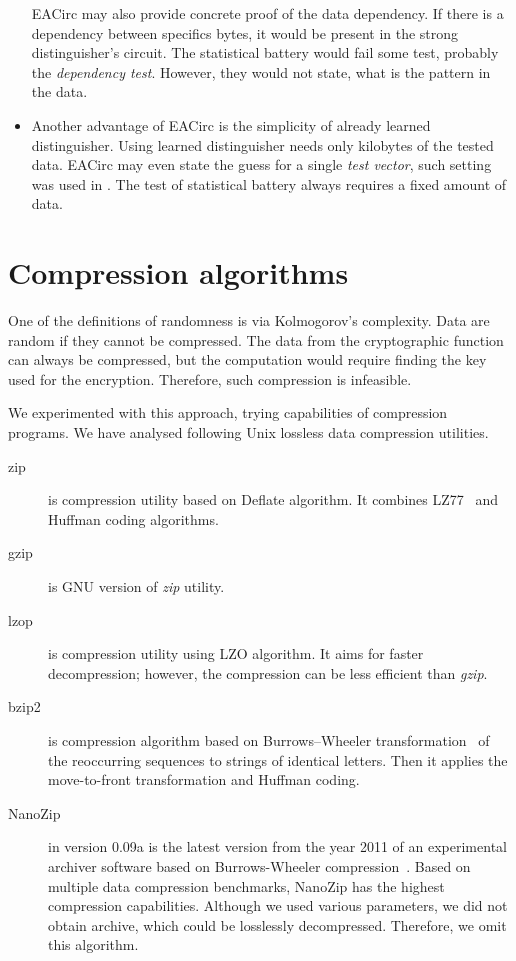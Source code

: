 \documentclass[
    digital,    %
    oneside,    %
    color,
    11pt,
    nocover,
    notable,
    nolof,
    nolot,
]{fithesis3}
\begin{document}
\begin{itemize}
    EACirc may also provide concrete proof of the data dependency. If there is a dependency between specifics bytes, it would be present in the strong distinguisher's circuit. The statistical battery would fail some test, probably the \textit{dependency test}. However, they would not state, what is the pattern in the data.
    \item Another advantage of EACirc is the simplicity of already learned distinguisher. Using learned distinguisher needs only kilobytes of the tested data. EACirc may even state the guess for a single \textit{test vector}, such setting was used in \cite{ukropBcThesis}. The test of statistical battery always requires a fixed amount of data.
\end{itemize}

\section{Compression algorithms}
\label{sec:relatwork-compress}

One of the definitions of randomness is via Kolmogorov's complexity. Data are random if they cannot be compressed. The data from the cryptographic function can always be compressed, but the computation would require finding the key used for the encryption. Therefore, such compression is infeasible.

We experimented with this approach, trying capabilities of compression programs. We have analysed following Unix lossless data compression utilities.

\begin{description}
    \item[zip] is compression utility based on Deflate algorithm. It combines LZ77~\cite{ziv1977universal} and Huffman coding algorithms.
    \item[gzip] is GNU version of \textit{zip} utility.
    \item[lzop] is compression utility using LZO algorithm. It aims for faster decompression; however, the compression can be less efficient than \textit{gzip}.
    \item[bzip2] is compression algorithm based on Burrows–Wheeler transformation~\cite{burrows1994block} of the reoccurring sequences to strings of identical letters. Then it applies the move-to-front transformation and Huffman coding. 
    \item[NanoZip] in version 0.09a is the latest version from the year 2011 of an experimental archiver software based on Burrows-Wheeler compression~\cite{nanozip}. Based on multiple data compression benchmarks, NanoZip has the highest compression capabilities. Although we used various parameters, we did not obtain archive, which could be losslessly decompressed. Therefore, we omit this algorithm.
\end{description}
\end{document}
